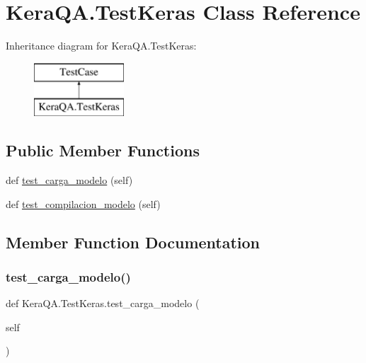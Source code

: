\hypertarget{class_kera_q_a_1_1_test_keras}{}\section{Kera\+Q\+A.\+Test\+Keras Class Reference}
\label{class_kera_q_a_1_1_test_keras}
Inheritance diagram for Kera\+Q\+A.\+Test\+Keras\+:\begin{figure}[H]
\begin{center}
\leavevmode
\includegraphics[height=2.000000cm]{class_kera_q_a_1_1_test_keras}
\end{center}
\end{figure}
\subsection*{Public Member Functions}
\begin{DoxyCompactItemize}
\item 
def \mbox{\hyperlink{class_kera_q_a_1_1_test_keras_a8861b428188d639538a61d0b20fede22}{test\+\_\+carga\+\_\+modelo}} (self)
\item 
def \mbox{\hyperlink{class_kera_q_a_1_1_test_keras_aa9ec17e7cad0fab158b9686266f80ec6}{test\+\_\+compilacion\+\_\+modelo}} (self)
\end{DoxyCompactItemize}


\subsection{Member Function Documentation}
\mbox{\label{class_kera_q_a_1_1_test_keras_a8861b428188d639538a61d0b20fede22}} 
\subsubsection{\texorpdfstring{test\+\_\+carga\+\_\+modelo()}{test\_carga\_modelo()}}
{\footnotesize\ttfamily def Kera\+Q\+A.\+Test\+Keras.\+test\+\_\+carga\+\_\+modelo (\begin{DoxyParamCaption}\item[{}]{self }\end{DoxyParamCaption})}

